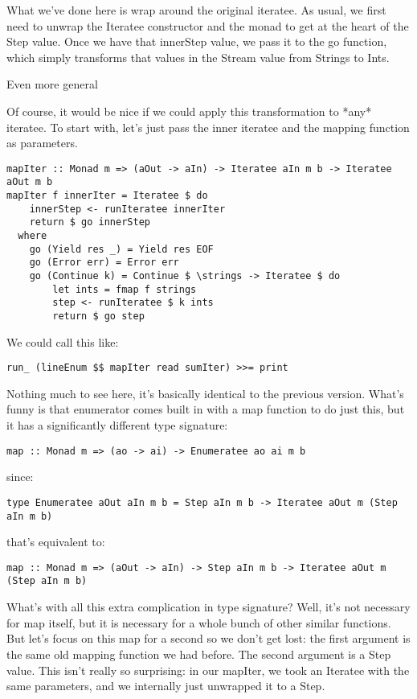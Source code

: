 What we've done here is wrap around the original iteratee. As usual, we first need to unwrap the Iteratee constructor and the monad to get at the heart of the Step value. Once we have that innerStep value, we pass it to the go function, which simply transforms that values in the Stream value from Strings to Ints.

Even more general

Of course, it would be nice if we could apply this transformation to *any* iteratee. To start with, let's just pass the inner iteratee and the mapping function as parameters.

\begin{lstlisting}
mapIter :: Monad m => (aOut -> aIn) -> Iteratee aIn m b -> Iteratee aOut m b
mapIter f innerIter = Iteratee $ do
    innerStep <- runIteratee innerIter
    return $ go innerStep
  where
    go (Yield res _) = Yield res EOF
    go (Error err) = Error err
    go (Continue k) = Continue $ \strings -> Iteratee $ do
        let ints = fmap f strings
        step <- runIteratee $ k ints
        return $ go step
\end{lstlisting}

We could call this like:

\begin{lstlisting}
run_ (lineEnum $$ mapIter read sumIter) >>= print
\end{lstlisting}

Nothing much to see here, it's basically identical to the previous version. What's funny is that enumerator comes built in with a map function to do just this, but it has a significantly different type signature:

\begin{lstlisting}
map :: Monad m => (ao -> ai) -> Enumeratee ao ai m b
\end{lstlisting}

since:

\begin{lstlisting}
type Enumeratee aOut aIn m b = Step aIn m b -> Iteratee aOut m (Step aIn m b)
\end{lstlisting}

that's equivalent to:

\begin{lstlisting}
map :: Monad m => (aOut -> aIn) -> Step aIn m b -> Iteratee aOut m (Step aIn m b)
\end{lstlisting}

What's with all this extra complication in type signature? Well, it's not necessary for map itself, but it is necessary for a whole bunch of other similar functions. But let's focus on this map for a second so we don't get lost: the first argument is the same old mapping function we had before. The second argument is a Step value. This isn't really so surprising: in our mapIter, we took an Iteratee with the same parameters, and we internally just unwrapped it to a Step.

